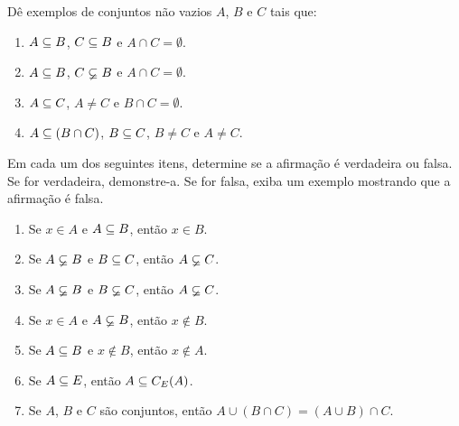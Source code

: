 \documentclass[12pt]{exam}
\begin{document}
    \questao{} D\^e exemplos de conjuntos n\~ao vazios $A$, $B$ e $C$ tais que:
    \begin{enumerate}[label={\alph*})]
        \item $A \subseteq B$, $C \subseteq B$ e $A \cap C = \emptyset$.
        \item $A \subseteq B$, $C \varsubsetneq B$ e $A \cap C = \emptyset$.
        \item $A \subseteq C$, $A \ne C$ e $B \cap C = \emptyset$.
        \item $A \subseteq (B \cap C)$, $B \subseteq C$, $B \ne C$ e $A \ne C$.
    \end{enumerate}

    \vspace{.3cm}

    \questao{} Em cada um dos seguintes itens, determine se a afirma\c{c}\~ao \'e
    verdadeira ou falsa. Se for verdadeira, demonstre-a. Se for falsa, exiba um
    exemplo mostrando que a afirma\c{c}\~ao \'e falsa.
    \begin{enumerate}[label={\alph*})]
    \item Se $x \in A$ e $A \subseteq B$, ent\~ao $x \in B$.

    \item Se $A \varsubsetneq B$ e $B \subseteq C$, ent\~ao $A \varsubsetneq C$.

    \item Se $A \varsubsetneq B$ e $B \varsubsetneq C$, ent\~ao $A \varsubsetneq C$.

    \item Se $x \in A$ e $A \varsubsetneq B$, ent\~ao $x \notin B$.

    \item Se $A \subseteq B$ e $x \notin B$, ent\~ao $x \notin A$.

    \item Se $A \subseteq E$, ent\~ao $A \subseteq C_E(A)$.

    \item Se $A$, $B$ e $C$ s\~ao conjuntos, ent\~ao $A \cup (B \cap C) = (A \cup B) \cap C$.
    \end{enumerate}
\end{document}
